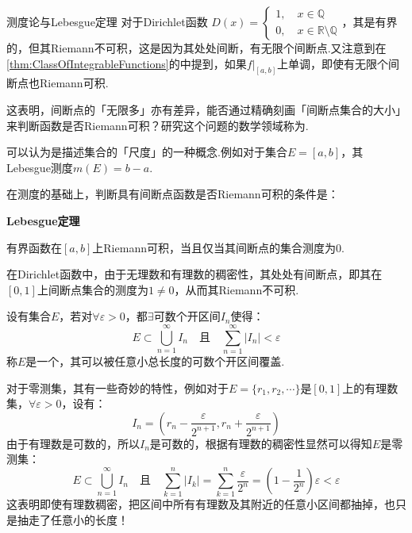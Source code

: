\begin{extension}{测度论与Lebesgue定理}
    对于Dirichlet函数
    $D(x) = \begin{cases}
        1, \quad x \in \mathbb{Q}\\
        0, \quad x \in \mathbb{R\setminus Q}
    \end{cases}$，其是有界的，但其Riemann不可积，这是因为其处处间断，有无限个间断点.又注意到在\cref{thm:ClassOfIntegrableFunctions}的中提到，如果$\left.f\right|_{[a,b]}$上单调，即使有无限个间断点也Riemann可积.

    这表明，间断点的「无限多」亦有差异，能否通过精确刻画「间断点集合的大小」来判断函数是否Riemann可积？研究这个问题的数学领域称为.

    可以认为是描述集合的「尺度」的一种概念.例如对于集合$E=[a,b]$，其Lebesgue测度$m(E)=b-a$.
    
    在测度的基础上，判断具有间断点函数是否Riemann可积的条件是：
    \begin{theorem}
        \textbf{Lebesgue定理}

        有界函数在$[a,b]$上Riemann可积，当且仅当其间断点的集合测度为$0$.
    \end{theorem}

    在Dirichlet函数中，由于无理数和有理数的稠密性，其处处有间断点，即其在$[0,1]$上间断点集合的测度为$1 \neq 0$，从而其Riemann不可积.

    \begin{definition}
        设有集合$E$，若对$\forall \varepsilon > 0$，都$\exists$可数个开区间$I_n$使得：
        \[E \subset \bigcup_{n=1}^{\infty} I_n \quad\text{且}\quad \sum_{n=1}^{\infty} |I_n| < \varepsilon\]
        称$E$是一个，其可以被任意小总长度的可数个开区间覆盖.
    \end{definition}
    
    对于零测集，其有一些奇妙的特性，例如对于$E=\{r_1,r_2,\cdots\}$是$[0,1]$上的有理数集，$\forall \varepsilon > 0$，设有：
    \[I_n = \left(r_n - \frac{\varepsilon}{2^{n+1}},r_n + \frac{\varepsilon}{2^{n+1}}\right)\]
    由于有理数是可数的，所以$I_n$是可数的，根据有理数的稠密性显然可以得知$E$是零测集：
    \[E \subset \bigcup_{n=1}^{\infty} I_n \quad\text{且}\quad \sum_{k=1}^{n} |I_k| = \sum_{k=1}^{n} \frac{\varepsilon}{2^n} = \left(1-\frac{1}{2^n}\right)\varepsilon < \varepsilon\]
    这表明即使有理数稠密，把区间中所有有理数及其附近的任意小区间都抽掉，也只是抽走了任意小的长度！
\end{extension}


